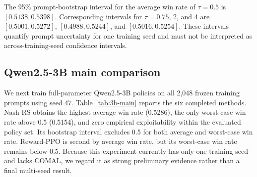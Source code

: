 \begin{table}[t]
  \centering
  \caption{Nash-RS temperature ablation at 0.5B (seed 47).  All rows use 512
  prompts and 256 optimizer steps.}
  \label{tab:tau-sweep}
  \small
\end{table}

The 95\% prompt-bootstrap interval for the average win rate of $\tau=0.5$ is
$[0.5138,0.5398]$.  Corresponding intervals for $\tau=0.75$, 2, and 4 are
$[0.5001,0.5272]$, $[0.4988,0.5244]$, and $[0.5016,0.5254]$.  These intervals
quantify prompt uncertainty for one training seed and must not be interpreted
as across-training-seed confidence intervals.

\subsection{Qwen2.5-3B main comparison}
\label{sec:3b-main}

We next train full-parameter Qwen2.5-3B policies on all 2,048 frozen training
prompts using seed 47.  Table~\ref{tab:3b-main} reports the six completed
methods.  Nash-RS obtains the highest average win rate (0.5286), the only
worst-case win rate above 0.5 (0.5154), and zero empirical exploitability
within the evaluated policy set.  Its bootstrap interval excludes 0.5 for both
average and worst-case win rate.  Reward-PPO is second by average win rate, but
its worst-case win rate remains below 0.5.  Because this experiment currently
has only one training seed and lacks COMAL, we regard it as strong preliminary
evidence rather than a final multi-seed result.

